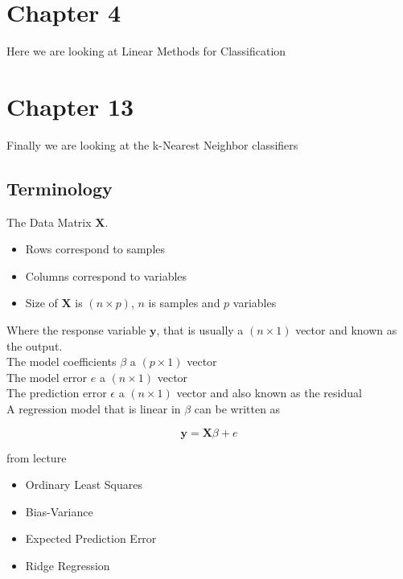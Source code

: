 \section{Chapter 4}

Here we are looking at Linear Methods for Classification

\section{Chapter 13}

Finally we are looking at the k-Nearest Neighbor classifiers


\subsection{Terminology}


The Data Matrix $\bm{X}$.

\begin{itemize}
  \item Rows correspond to samples
  \item Columns correspond to variables
  \item Size of $\bm{X}$ is $(n \times p)$, $n$ is samples and $p$ variables
\end{itemize}

Where the response variable $\bm{y}$, that is usually a $(n \times 1)$ vector and known as the output.\\

The model coefficients $\beta$ a $(p \times 1)$ vector\\

The model error $e$ a $(n \times 1)$ vector\\

The prediction error $\epsilon$ a $(n \times 1)$ vector and also known as the residual\\

A regression model that is linear in $\beta$ can be written as

\[
    \bm{y} = \bm{X} \beta + e
\]

from lecture \cite[p.~28]{lecture1}


\begin{itemize}
  \item Ordinary Least Squares
  \item Bias-Variance
  \item Expected Prediction Error
  \item Ridge Regression
\end{itemize}

